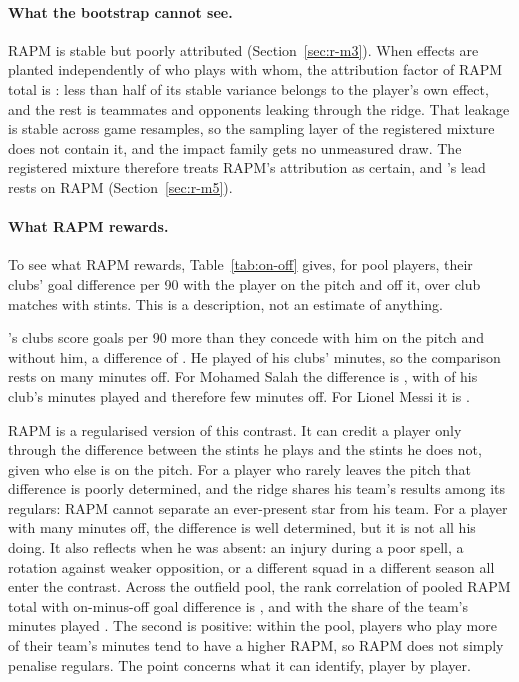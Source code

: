 \documentclass[11pt,a4paper]{article}
\begin{document}
\paragraph{What the bootstrap cannot see.}
RAPM is stable but poorly attributed (Section~\ref{sec:r-m3}). When effects
are planted independently of who plays with whom, the attribution factor of
RAPM total is \AttrFullTotal{}: less than half of its stable variance belongs
to the player's own effect, and the rest is teammates and opponents leaking
through the ridge. That leakage is stable across game resamples, so the
sampling layer of the registered mixture does not contain it, and the impact
family gets no unmeasured draw. The registered mixture therefore treats RAPM's
attribution as certain, and \TopPlayerName{}'s lead rests on RAPM
(Section~\ref{sec:r-m5}).

\paragraph{What RAPM rewards.}
To see what RAPM rewards, Table~\ref{tab:on-off} gives, for pool players,
their clubs' goal difference per 90 with the player on the pitch and off it,
over club matches with stints. This is a description, not an estimate of
anything.

\TopPlayerName{}'s clubs score \OnOffLeaderOn{} goals per 90 more than they
concede with him on the pitch and \OnOffLeaderOff{} without him, a difference
of \OnOffLeaderDiff{}. He played \OnOffLeaderShare{} of his clubs' minutes, so
the comparison rests on many minutes off. For Mohamed Salah the difference is
\OnOffSalahDiff{}, with \OnOffSalahShare{} of his club's minutes played and
therefore few minutes off. For Lionel Messi it is \OnOffMessiDiff{}.

RAPM is a regularised version of this contrast. It can credit a player only
through the difference between the stints he plays and the stints he does
not, given who else is on the pitch. For a player who rarely leaves the pitch
that difference is poorly determined, and the ridge shares his team's results
among its regulars: RAPM cannot separate an ever-present star from his team.
For a player with many minutes off, the difference is well determined, but it
is not all his doing. It also reflects when he was absent: an injury during a
poor spell, a rotation against weaker opposition, or a different squad in a
different season all enter the contrast. Across the outfield pool, the rank
correlation of pooled RAPM total with on-minus-off goal difference is
\OnOffSpearmanDiff{}, and with the share of the team's minutes played
\OnOffSpearmanShare{}. The second is positive: within the pool, players who
play more of their team's minutes tend to have a higher RAPM, so RAPM does not
simply penalise regulars. The point concerns what it can identify, player by
player.
\end{document}
